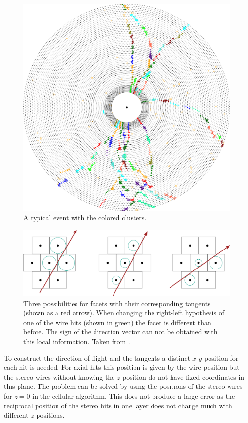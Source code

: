\begin{figure}
  \centering
  \includegraphics[width=0.8\linewidth]{figures/theory/segments.png} 
  \caption[Clusters and resulting segments in the automaton track finder.]{A typical event with the colored clusters.}
  \label{fig-clusters-and-segments}
\end{figure}

\begin{figure}
  \centering
  \includegraphics[width=\linewidth]{figures/theory/facets.pdf}
  \caption[Facets used in the automaton track finder.]{Three possibilities for facets with their corresponding tangents (shown as a red arrow). When changing the right-left hypothesis of one of the wire hits (shown in green) the facet is different than before. The sign of the direction vector can not be obtained with this local information. Taken from \cite{oliver}.}
  \label{fig-facets}
\end{figure}

To construct the direction of flight and the tangents a distinct $x$-$y$ position for each hit is needed. For axial hits this position is given by the wire position but the stereo wires without knowing the $z$ position do not have fixed coordinates in this plane. The problem can be solved by using the positions of the stereo wires for $z = 0$ in the cellular algorithm. This does not produce a large error as the reciprocal position of the stereo hits in one layer does not change much with different $z$ positions.

